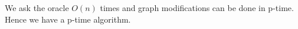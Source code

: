 \documentclass[a4paper, draft, 12pt]{article}
\begin{document}
\begin{enumerate}
\begin{enumerate}
\begin{enumerate}
  We ask the oracle $O(n)$ times and graph modifications can be done in p-time.
  Hence we have a p-time algorithm. 

  \end{enumerate}

\end{enumerate}




\end{enumerate}
\end{document}
